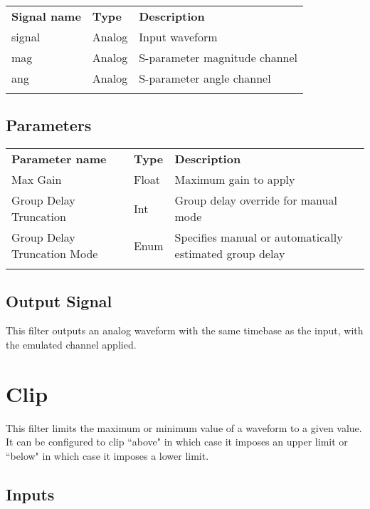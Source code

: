 \begin{tabularx}{16cm}{llX}
\thickhline
\textbf{Signal name} & \textbf{Type} & \textbf{Description} \\
\thickhline
signal & Analog & Input waveform \\
\thinhline
mag & Analog & S-parameter magnitude channel \\
\thinhline
ang & Analog & S-parameter angle channel \\
\thickhline
\end{tabularx}

\subsection{Parameters}

\begin{tabularx}{16cm}{llX}
\thickhline
\textbf{Parameter name} & \textbf{Type} & \textbf{Description} \\
\thickhline
Max Gain & Float & Maximum gain to apply\\
\thinhline
Group Delay Truncation & Int & Group delay override for manual mode\\
\thinhline
Group Delay Truncation Mode & Enum & Specifies manual or automatically estimated group delay\\
\thickhline
\end{tabularx}

\subsection{Output Signal}

This filter outputs an analog waveform with the same timebase as the input, with the emulated channel applied.

\pagebreak
\section{Clip}
\label{filter:clip}

This filter limits the maximum or minimum value of a waveform to a given value. It can be configured
to clip ``above" in which case it imposes an upper limit or ``below" in which case it imposes a lower
limit.

\subsection{Inputs}

